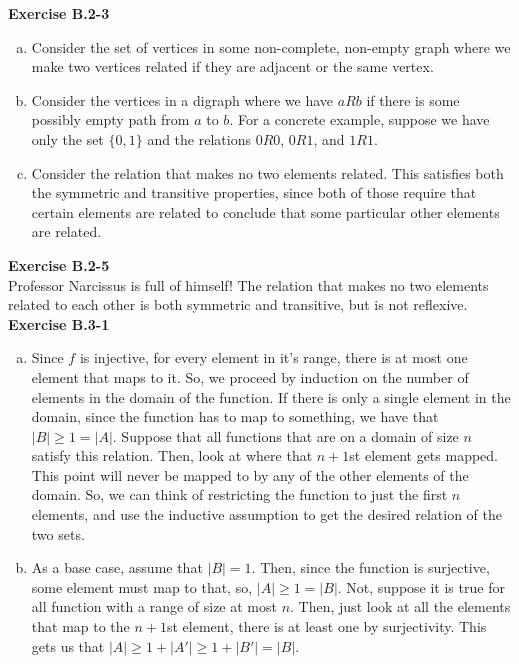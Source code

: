 \documentclass{article}
\begin{document}
\noindent\textbf{Exercise B.2-3}\\
\begin{enumerate}[a.]
\item
Consider the set of vertices in some non-complete, non-empty graph where we make two vertices related if they are adjacent or the same vertex.
\item
Consider the vertices in a digraph where we have $aRb$ if there is some possibly empty path from $a$ to $b$. For a concrete example, suppose we have only the set $\{0,1\}$ and the relations $0R0$, $0R1$, and $1R1$.
\item
Consider the relation that makes no two elements related. This satisfies both the symmetric and transitive properties, since both of those require that certain elements are related to conclude that some particular other elements are related.\\

\end{enumerate}

\noindent\textbf{Exercise B.2-5}\\
Professor Narcissus is full of himself! The relation that makes no two elements related to each other is both symmetric and transitive, but is not reflexive.\\

\noindent\textbf{Exercise B.3-1}\\
\begin{enumerate}[a.]
\item
Since $f$ is injective, for every element in it's range, there is at most one element that maps to it. So, we proceed by induction on the number of elements in the domain of the function. If there is only a single element in the domain, since the function has to map to something, we have that $|B|\ge 1 = |A|$. Suppose that all functions that are on a domain of size $n$ satisfy this relation. Then, look at where that $n+1$st element gets mapped. This point will never be mapped to by any of the other elements of the domain. So, we can think of restricting the function to just the first $n$ elements, and use the inductive assumption to get the desired relation of the two sets.
\item
As a base case, assume that $|B|=1$. Then, since the function is surjective, some element must map to that, so, $|A|\ge 1 = |B|$. Not, suppose it is true for all function with a range of size at most $n$. Then, just look at all the elements that map to the $n+1$st element, there is at least one by surjectivity. This gets us that $|A| \ge 1 + |A'| \ge 1 + |B'| = |B|$.
\end{enumerate}
\end{document}
